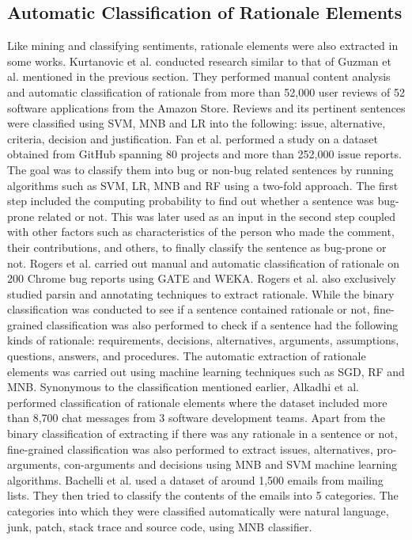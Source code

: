 \documentclass[a4paper,12pt,twoside]{report}
\begin{document}
\subsection{Automatic Classification of Rationale Elements}
Like mining and classifying sentiments, rationale elements were also extracted in some works. Kurtanovic et al.\cite{Kurtanovic2017} conducted research similar to that of Guzman et al.\cite{Guzman2017} mentioned in the previous section. They performed manual content analysis and automatic classification of rationale from more than 52,000 user reviews of 52 software applications from the Amazon Store. Reviews and its pertinent sentences were classified using SVM, MNB and LR into the following: issue, alternative, criteria, decision and justification.  
\bigbreak
Fan et al.\cite{Fan2017} performed a study on a dataset obtained from GitHub spanning 80 projects and more than 252,000 issue reports. The goal was to classify them into bug or non-bug related sentences by running algorithms such as SVM, LR, MNB and RF using a two-fold approach. The first step included the computing probability to find out whether a sentence was bug-prone related or not. This was later used as an input in the second step coupled with other factors such as characteristics of the person who made the comment, their contributions, and others, to finally classify the sentence as bug-prone or not. 
\bigbreak
Rogers et al.\cite{Rogers2014} carried out manual and automatic classification of rationale on 200 Chrome bug reports using GATE and WEKA. Rogers et al.\cite{Rogers2012} also exclusively studied parsin and annotating techniques to extract rationale. While the binary classification was conducted to see if a sentence contained rationale or not, fine-grained classification was also performed to check if a sentence had the following kinds of rationale: requirements, decisions, alternatives, arguments, assumptions, questions, answers, and procedures. The automatic extraction of rationale elements was carried out using machine learning techniques such as SGD, RF and MNB. 
\bigbreak
Synonymous to the classification mentioned earlier, Alkadhi et al.\cite{Alkadhi2017} performed classification of rationale elements where the dataset included more than 8,700 chat messages from 3 software development teams. Apart from the binary classification of extracting if there was any rationale in a sentence or not, fine-grained classification was also performed to extract issues, alternatives, pro-arguments, con-arguments and decisions using MNB and SVM machine learning algorithms. 
\bigbreak
Bachelli et al.\cite{Bacchelli2012} used a dataset of around 1,500 emails from mailing lists. They then tried to classify the contents of the emails into 5 categories. The categories into which they were classified automatically were natural language, junk, patch, stack trace and source code, using MNB classifier. 
\end{document}
